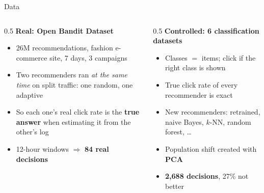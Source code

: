 \documentclass[aspectratio=169,11pt]{beamer}
\begin{document}
\begin{frame}{Data}
\begin{columns}[T]
\begin{column}{0.5\textwidth}
\textbf{Real: Open Bandit Dataset}
\begin{itemize}
  \item 26M recommendations, fashion e-commerce site, 7 days, 3 campaigns
  \item Two recommenders ran \emph{at the same time} on split traffic: one random, one adaptive
  \item So each one's real click rate is the \textbf{true answer} when estimating it from the other's log
  \item 12-hour windows $\Rightarrow$ \textbf{84 real decisions}
\end{itemize}
\end{column}
\begin{column}{0.5\textwidth}
\textbf{Controlled: 6 classification datasets}
\begin{itemize}
  \item Classes $=$ items; click if the right class is shown
  \item True click rate of every recommender is exact
  \item New recommenders: retrained, naive Bayes, $k$-NN, random forest, \ldots
  \item Population shift created with \textbf{PCA}
  \item \textbf{2,688 decisions}, 27\% not better
\end{itemize}
\end{column}
\end{columns}
\end{frame}
\end{document}
